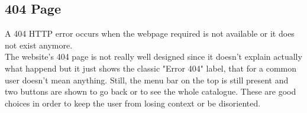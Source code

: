 \subsection{404 Page}

A 404 HTTP error occurs when the webpage required is not available or it does not exist anymore. \\
The website's 404 page is not really well designed since it doesn't explain actually what happend but it just shows the
classic "Error 404" label, that for a common user doesn't mean anything.
Still, the menu bar on the top is still present and two buttons are shown to go back or to see the whole catalogue.
These are good choices in order to keep the user from losing context or be disoriented.
